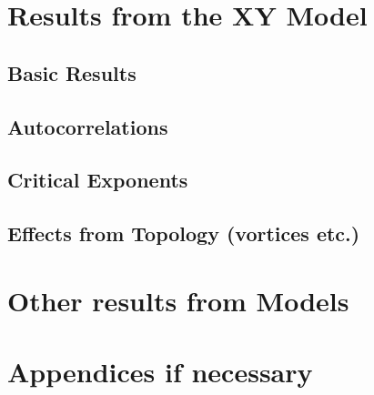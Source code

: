 \documentclass[a4paper,notitlepage]{report}
\begin{document}
\chapter{Results from the XY Model}
	\section{Basic Results}
	\section{Autocorrelations}
	\section{Critical Exponents}
	\section{Effects from Topology (vortices etc.)}
\chapter{Other results from Models}
\chapter{Appendices if necessary}
\end{document}
